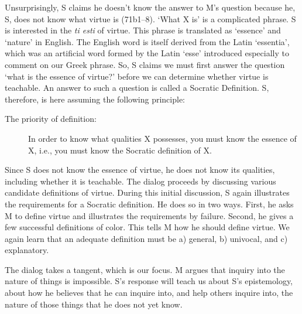 \documentclass[10 pt]{article}
\begin{document}
Unsurprisingly, S claims he doesn't know the answer to M's question because he, S, does not know what virtue is (71b1--8). `What X is' is a complicated phrase. S is interested in the \emph{ti esti} of virtue. This phrase is translated as `essence' and `nature' in English. The English word  is itself derived from the Latin `essentia', which was an artificial word formed by the Latin `esse' introduced especially to comment on our Greek phrase. So, S claims we must first answer the question `what is the essence of virtue?' before we can determine whether virtue is teachable. An answer to such a question is called a Socratic Definition. S, therefore, is here assuming the following principle: 
\begin{description}
\item[The priority of definition:] In order to know what qualities X possesses, you must know the essence of X, i.e., you must know the Socratic definition of X. 
\end{description}
Since S does not know the essence of virtue, he does not know its qualities, including whether it is teachable. The dialog proceeds by discussing  various candidate definitions of virtue. During this initial discussion, S again illustrates the requirements for a Socratic definition. He does so in two ways. First, he asks M to define virtue and illustrates the requirements by failure. Second, he gives a few successful definitions of color. This tells M how he should define virtue. We again learn that an adequate definition must be a) general, b) univocal, and c) explanatory. 


 The dialog takes a tangent, which is our focus. M argues that inquiry into the nature of things is impossible. S's response will teach us about S's epistemology, about how he believes that he can inquire into, and help others inquire into, the nature of those things that he does not yet know. 
\end{document}
